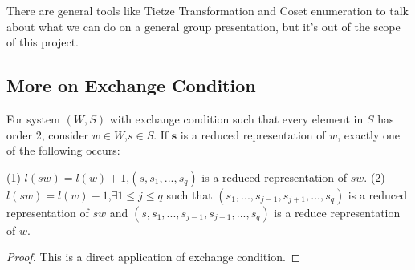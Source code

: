 There are general tools like Tietze Transformation and Coset enumeration to talk about what we can do on a general group presentation, but it's out of the scope of this project.

\subsection{More on Exchange Condition}
\begin{proposition}
    For system $(W,S)$ with exchange condition such that every element in $S$ has order 2, consider $w\in W$,$s\in S$. If $\mathbf{s}$ is a reduced representation of $w$, exactly one of the following occurs:

(1) $l(sw)=l(w)+1$,$(s,s_1,...,s_q)$ is a reduced representation of $sw$.
(2) $l(sw)=l(w)-1$,$\exists 1\le j \le q$  such that $(s_1,...,s_{j-1},s_{j+1},...,s_q)$ is a reduced representation of $sw$ and $(s,s_1,...,s_{j-1},s_{j+1},...,s_q)$ is a reduce representation of $w$. 
\end{proposition} 

\begin{proof}
    This is a direct application of exchange condition.
\end{proof}
